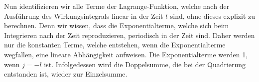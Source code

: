       \iffalse
      \begin{align}
        \begin{split}
          L &= \frac{1}{2}m\dot \zeta^2 - \frac{1}{2}m\omega_0^2\zeta^2 + S(t)\zeta \\
           &=\frac{-\omega^2}{2m} \sum_j \sum_l \frac{jc_j}{\omega_0^2-j^2\omega^2} \frac{lc_l}{\omega_0^2-l^2\omega^2} \text e^{\text i(j+l)\omega t}\\
           &\quad-\frac{\omega_0^2}{2m} \sum_j \sum_l \frac{c_j}{\omega_0^2-j^2\omega^2} \frac{c_l}{\omega_0^2-l^2\omega^2} \text e^{\text i(j+l)\omega t}\\
           &\quad + \frac{1}{m} \sum_j \sum_l \frac{c_jc_l}{\omega_0^2-j^2\omega^2} \text e^{\text i(j+l)\omega t}\; , \; j,l \in \mathbb{Z} \; .
         \end{split}
       \end{align}
       \fi
\iffalse
       Nun identifizieren wir alle Terme der Lagrange-Funktion, welche nach der Ausführung des Wirkungsintegrals linear in der Zeit $t$ sind, ohne dieses explizit zu berechnen.
       Denn wir wissen, dass die Exponentialterme, welche sich beim Integrieren nach der Zeit reproduzieren, periodisch in der Zeit sind.
       Daher werden nur die konstanten Terme, welche entstehen, wenn die Exponentialterme wegfallen, eine lineare Abhängigkeit aufweisen.
       Die Exponentialterme werden 1, wenn $j=-l$ ist.
       Infolgedessen wird die Doppelsumme, die bei der Quadrierung entstanden ist, wieder zur Einzelsumme.


